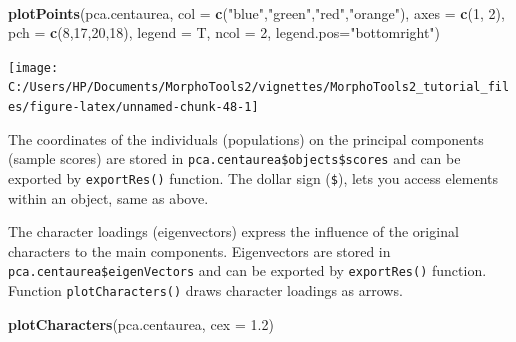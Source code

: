 \documentclass[
]{article}
\newenvironment{Shaded}{\begin{snugshade}}{\end{snugshade}}
\newcommand{\DataTypeTok}[1]{\textcolor[rgb]{0.13,0.29,0.53}{#1}}
\newcommand{\DecValTok}[1]{\textcolor[rgb]{0.00,0.00,0.81}{#1}}
\newcommand{\FloatTok}[1]{\textcolor[rgb]{0.00,0.00,0.81}{#1}}
\newcommand{\KeywordTok}[1]{\textcolor[rgb]{0.13,0.29,0.53}{\textbf{#1}}}
\newcommand{\NormalTok}[1]{#1}
\newcommand{\OperatorTok}[1]{\textcolor[rgb]{0.81,0.36,0.00}{\textbf{#1}}}
\newcommand{\StringTok}[1]{\textcolor[rgb]{0.31,0.60,0.02}{#1}}
\begin{document}
~

\begin{Shaded}
\begin{Highlighting}[]
\KeywordTok{plotPoints}\NormalTok{(pca.centaurea, }\DataTypeTok{col =} \KeywordTok{c}\NormalTok{(}\StringTok{"blue"}\NormalTok{,}\StringTok{"green"}\NormalTok{,}\StringTok{"red"}\NormalTok{,}\StringTok{"orange"}\NormalTok{), }\DataTypeTok{axes =} \KeywordTok{c}\NormalTok{(}\DecValTok{1}\NormalTok{, }\DecValTok{2}\NormalTok{),}
           \DataTypeTok{pch =} \KeywordTok{c}\NormalTok{(}\DecValTok{8}\NormalTok{,}\DecValTok{17}\NormalTok{,}\DecValTok{20}\NormalTok{,}\DecValTok{18}\NormalTok{), }\DataTypeTok{legend =}\NormalTok{ T, }\DataTypeTok{ncol =} \DecValTok{2}\NormalTok{, }\DataTypeTok{legend.pos=}\StringTok{"bottomright"}\NormalTok{)}
\end{Highlighting}
\end{Shaded}

\begin{center}\texttt{[image: C:/Users/HP/Documents/MorphoTools2/vignettes/MorphoTools2\_tutorial\_files/figure-latex/unnamed-chunk-48-1]} \end{center}

The coordinates of the individuals (populations) on the principal
components (sample scores) are stored in
\texttt{pca.centaurea\$objects\$scores} and can be exported by
\texttt{exportRes()} function. The dollar sign (\texttt{\$}), lets you
access elements within an object, same as above.

\begin{Shaded}
\end{Shaded}

The character loadings (eigenvectors) express the influence of the
original characters to the main components. Eigenvectors are stored in
\texttt{pca.centaurea\$eigenVectors} and can be exported by
\texttt{exportRes()} function. Function \texttt{plotCharacters()} draws
character loadings as arrows.

\begin{Shaded}
\begin{Highlighting}[]
\KeywordTok{plotCharacters}\NormalTok{(pca.centaurea, }\DataTypeTok{cex =} \FloatTok{1.2}\NormalTok{)}
\end{Highlighting}
\end{Shaded}
\end{document}
